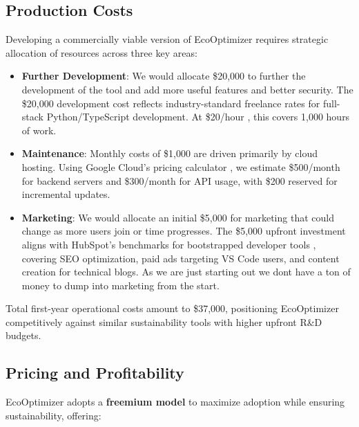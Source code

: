 \documentclass{article}
\begin{document}
\subsection{Production Costs}  
Developing a commercially viable version of EcoOptimizer requires strategic allocation of resources across three key areas:  

\begin{itemize}  
    \item \textbf{Further Development}: We would allocate \$20,000 to further the development 
    of the tool and add more useful features and better security. The \$20,000 development 
    cost reflects industry-standard freelance rates for full-stack Python/TypeScript 
    development. At \$20/hour \cite{upwork2025rates}, this covers 1,000 hours of work.

    \item \textbf{Maintenance}: Monthly costs of \$1,000 are driven primarily by cloud 
    hosting. Using Google Cloud’s pricing calculator \cite{googlecloud2025pricing}, 
    we estimate \$500/month for backend servers and \$300/month for API usage, with 
    \$200 reserved for incremental updates.  

    \item \textbf{Marketing}: We would allocate an initial \$5,000 for marketing 
    that could change as more users join or time progresses.
     The \$5,000 upfront investment aligns with HubSpot’s 
    benchmarks for bootstrapped developer tools \cite{hubspot2025marketing}, 
    covering SEO optimization, paid ads targeting VS Code users, and content 
    creation for technical blogs. As we are just starting out we dont have 
    a ton of money to dump into marketing from the start.

\end{itemize}  

\noindent Total first-year operational costs amount to \$37,000, positioning EcoOptimizer competitively against similar sustainability tools with higher upfront R\&D budgets.  

\subsection{Pricing and Profitability}  
EcoOptimizer adopts a \textbf{freemium model} to maximize adoption while ensuring sustainability, offering:  
\end{document}

